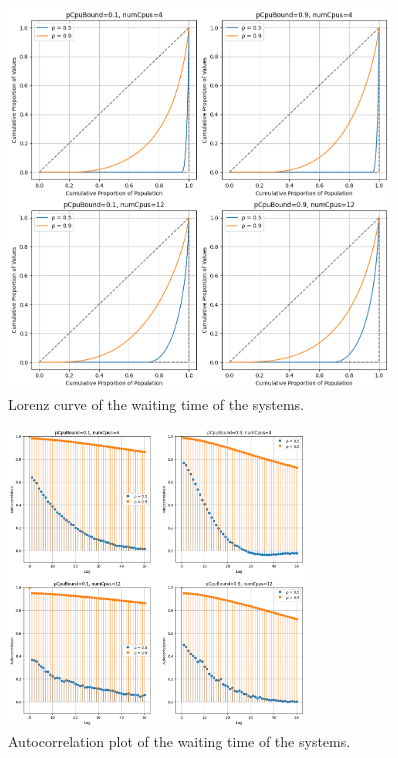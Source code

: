 \begin{figure}[H]
    \captionsetup{type=figure}
    \centering
    \includegraphics[width=0.9\textwidth]{./images/04/fcfs/wait/lorenz.png}
    \caption{Lorenz curve of the waiting time of the systems.}
    \label{fig:fcfsWaitLorenz}
\end{figure}


\begin{figure}[H]
    \captionsetup{type=figure}
    \centering
    \includegraphics[width=0.7\textwidth]{./images/04/fcfs/wait/autocorrelation.png}
    \caption{Autocorrelation plot of the waiting time of the systems.}
    \label{fig:fcfsWaitAutocorrelation}
\end{figure}



